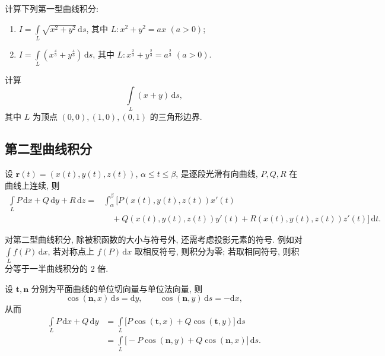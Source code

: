 \documentclass[../数学分析培优讲义.tex]{subfiles}
\begin{document}
\begin{example}
计算下列第一型曲线积分:
\begin{enumerate}[label=(\arabic*)]
    \item $\displaystyle I=\int\limits_L\sqrt{x^2+y^2}\,\mathrm{d}s$, 其中 $L:x^2+y^2=ax$ $(a>0)$;
    \item $\displaystyle I=\int\limits_L\left(x^{\frac{4}{3}}+y^{\frac{4}{3}}\right)\,\mathrm{d}s$, 其中 $L:x^{\frac{2}{3}}+y^{\frac{2}{3}}=a^{\frac{2}{3}}$ $(a>0)$.
\end{enumerate}
\end{example}
\exampleblank

\begin{example}
计算
\[
    \int\limits_L(x+y)\,\mathrm{d}s,
\]
其中 $L$ 为顶点 $(0,0),(1,0),(0,1)$ 的三角形边界.
\end{example}
\exampleblank


\newpage

\subsection{第二型曲线积分}

\begin{theorem}[\markstar]
设 $\bm r(t)=(x(t),y(t),z(t))$, $\alpha\leq t\leq\beta$, 是逐段光滑有向曲线, $P,Q,R$ 在曲线上连续, 则
\[
\begin{aligned}
    \int\limits_L P\,\mathrm{d}x+Q\,\mathrm{d}y+R\,\mathrm{d}z
    ={}&\int_\alpha^\beta\bigl\lbrack P(x(t),y(t),z(t))x'(t)\\
    &\quad+Q(x(t),y(t),z(t))y'(t)+R(x(t),y(t),z(t))z'(t)\bigr\rbrack\,\mathrm{d}t.
\end{aligned}
\]
\end{theorem}

\begin{theorem}
对第二型曲线积分, 除被积函数的大小与符号外, 还需考虑投影元素的符号. 例如对 $\displaystyle\int\limits_L f(P)\,\mathrm{d}x$, 若对称点上 $f(P)\,\mathrm{d}x$ 取相反符号, 则积分为零; 若取相同符号, 则积分等于一半曲线积分的 $2$ 倍.
\end{theorem}

\begin{theorem}
设 $\bm t,\bm n$ 分别为平面曲线的单位切向量与单位法向量, 则
\[
    \cos(\bm n,x)\,\mathrm{d}s=\mathrm{d}y,
    \qquad
    \cos(\bm n,y)\,\mathrm{d}s=-\mathrm{d}x,
\]
从而
\[
\begin{aligned}
    \int\limits_L P\,\mathrm{d}x+Q\,\mathrm{d}y
    &=\int\limits_L\bigl\lbrack P\cos(\bm t,x)+Q\cos(\bm t,y)\bigr\rbrack\,\mathrm{d}s\\
    &=\int\limits_L\bigl\lbrack -P\cos(\bm n,y)+Q\cos(\bm n,x)\bigr\rbrack\,\mathrm{d}s.
\end{aligned}
\]
\end{theorem}
\end{document}
